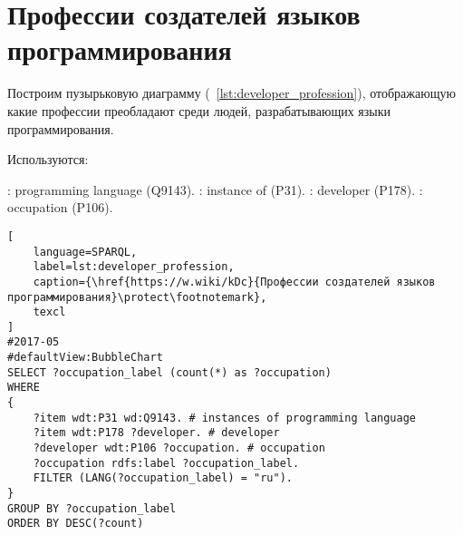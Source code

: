 \section{Профессии создателей языков программирования}
Построим пузырьковую диаграмму (~\ref{lst:developer_profession}), отображающую какие профессии преобладают среди людей, разрабатывающих языки программирования.

Используются:
\begin{itemize}
: programming language (Q9143).
: instance of (P31).
: developer (P178).
: occupation (P106).
\end{itemize}

\begin{lstlisting}[
	language=SPARQL,
	label=lst:developer_profession,
	caption={\href{https://w.wiki/kDc}{Профессии создателей языков программирования}\protect\footnotemark},
	texcl
]
#2017-05
#defaultView:BubbleChart
SELECT ?occupation_label (count(*) as ?occupation)
WHERE
{
    ?item wdt:P31 wd:Q9143. # instances of programming language 
    ?item wdt:P178 ?developer. # developer
    ?developer wdt:P106 ?occupation. # occupation
    ?occupation rdfs:label ?occupation_label. 
    FILTER (LANG(?occupation_label) = "ru"). 
}
GROUP BY ?occupation_label 
ORDER BY DESC(?count)
\end{lstlisting}

\begin{marginfigure}
{
\setlength{\fboxsep}{0pt}%
\setlength{\fboxrule}{1pt}%
%
}
  \caption{Профессии людей, которые разрабатывают языки программирования (2017).}%
  \label{fig:profession_2017}%
\end{marginfigure}
\begin{marginfigure}
{
\setlength{\fboxsep}{0pt}%
\setlength{\fboxrule}{1pt}%
%
}
  \caption{Профессии людей, которые разрабатывают языки программирования (2020).}%
  \label{fig:profession_2020}%
\end{marginfigure}

